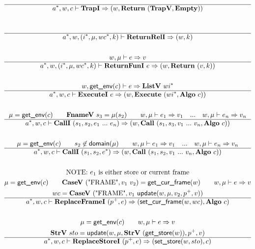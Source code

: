 \begin{gather*}
  \\
  \hline
  \seq{a}, w, c \vdash \trapi \Rightarrow (w, \ret ~ (\trapv, \mt)) \\
%
\newline \\
  \\
  \hline
  \seq{a}, w, (\seq{i}, \mu, wc^*, k) \vdash \returnreli \Rightarrow (w, k) \\
%
\newline \\
  w, \mu \vdash e \Rightarrow v \\
  \hline
  \seq{a}, w, (\seq{i}, \mu, wc^*, k) \vdash \returnfuni ~ e \Rightarrow
  (w, \ret ~ (v, k)) \\
%
\newline \\
  w, \getenv(c) \vdash e \Rightarrow \listv ~ wi^* \\
  \hline
  \seq{a}, w, c \vdash \executei ~ e \Rightarrow
  (w, \exe ~ (wi^*, \algo ~ c)) \\
%
\newline \\
  \mu = \getenv(c) \qquad
  \fnamev ~ s_3 = \mu(s_2) \qquad
  w, \mu \vdash e_1 \Rightarrow v_1 \quad ... \quad
  w, \mu \vdash e_n \Rightarrow v_n \\
  \hline
  \seq{a}, w, c \vdash \calli ~ (s_1, s_2, e_1 ~ ... ~ e_n) \Rightarrow
  (w, \call ~ (s_1, s_3, v_1 ~ ... ~ v_n, \algo ~ c)) \\
%
\newline \\
  \mu = \getenv(c) \qquad
  s_2 \not\in \domain(\mu) \qquad
  w, \mu \vdash e_1 \Rightarrow v_1 \quad ... \quad
  w, \mu \vdash e_n \Rightarrow v_n \\
  \hline
  \seq{a}, w, c \vdash \calli ~ (s_1, s_2, \seq e) \Rightarrow
  (w, \call ~ (s_1, s_2, v_1 ~ ... ~ v_n, \algo ~ c)) \\
%
\newline \\
\text{NOTE: $e_1$ is either store or current frame} \\
  \mu = \getenv(c) \qquad
  \casev ~ (\text{"FRAME"}, v_1 ~ v_2) = \getcurframe(w) \qquad
  w, \mu \vdash e \Rightarrow v \\
  wc = \casev ~ (\text{"FRAME"}, v_1 ~ \update(w, \mu, v_2, p^+, v)) \\
  \hline
  \seq{a}, w, c \vdash \replaceframei ~ (p^+, e) \Rightarrow
  (\setcurframe(w, wc), \algo ~ c) \\
%
\newline \\
  \mu = \getenv(c) \qquad
  w, \mu \vdash e \Rightarrow v \\
  \strv ~ sto = \update(w, \mu, \strv ~ (\getstore(w)), p^+, v) \\
  \hline
  \seq{a}, w, c \vdash \replacestorei ~ (p^+, e)
  \Rightarrow (\setstore(w, sto), c) \\
\end{gather*}

